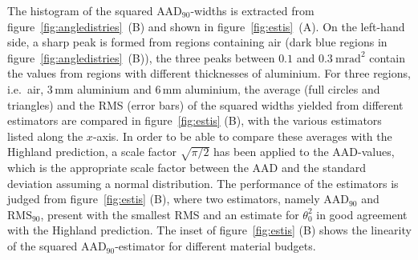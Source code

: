 \documentclass{PoS}
\newcommand{\rmsninety}{\ensuremath{\textrm{RMS}_\textrm{90}}}
\newcommand{\aadninety}{\ensuremath{\textrm{AAD}_\textrm{90}}}
\begin{document}
%

The histogram of the squared $\aadninety$-widths is extracted from figure~\ref{fig:angledistries}~(B) and shown in figure~\ref{fig:estis}~(A).
On the left-hand side, a sharp peak is formed from regions containing air (dark blue regions in figure~\ref{fig:angledistries}~(B)),
 the three peaks between $0.1$ and $\SI{0.3}{\milli\radian}^2$ contain the values from regions with different thicknesses of aluminium.
For three regions, i.e.\ air, 3\,mm aluminium and 6\,mm aluminium, the average (full circles and triangles) and the RMS (error bars) of the squared widths yielded from different estimators are compared in figure~\ref{fig:estis} (B), 
 with the various estimators listed along the $x$-axis. 
In order to be able to compare these averages with the Highland prediction, a scale factor $\sqrt{\pi/2}$
 has been applied to the AAD-values, which is the appropriate scale factor between the AAD and the standard deviation assuming a normal distribution. 
The performance of the estimators is judged from figure~\ref{fig:estis} (B), where
two estimators, namely $\aadninety$ and $\rmsninety$, present with the smallest RMS and an estimate for $\theta_0^2$ in good agreement with the Highland prediction. 
The inset of figure~\ref{fig:estis} (B) shows the linearity of the squared $\aadninety$-estimator for different material budgets. 
\end{document}
